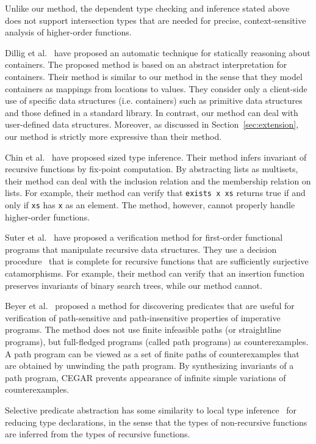 Unlike our method,
the dependent type checking and inference stated
above~\cite{Unno2010,Rondon2008,Kawaguchi2009,Unno2009} does not support
intersection types that are needed for precise, context-sensitive analysis
of higher-order functions.

Dillig et al.~\cite{Dillig2011} have proposed an automatic technique for
statically reasoning about containers.  The proposed method is based on
an abstract interpretation for containers.  Their method is similar to
our method in the sense that they model containers as mappings from
locations to values.  They consider only a client-side use of specific
data structures (i.e. containers) such as primitive data structures and
those defined in a standard library.  In contrast, our method can deal
with user-defined data structures.  Moreover, as discussed in
Section~\ref{sec:extension}, our method is strictly more expressive than
their method.

Chin et al.~\cite{Chin2003} have proposed sized type inference.  Their
method infers invariant of recursive functions by fix-point computation.
By abstracting lists as multisets, their method can deal with the
inclusion relation and the membership relation on lists.  For example, their method
can verify that \texttt{exists x xs} returns true if and only if
\texttt{xs} has \texttt{x} as an element.  The method, however, cannot
properly handle higher-order functions.

Suter et al.~\cite{Suter2011} have proposed a verification method for first-order
functional programs that manipulate recursive data
structures.  They use a decision
procedure~\cite{Suter2010} that is complete for recursive functions that
are sufficiently surjective catamorphisms.  For example, their method
can verify that an insertion function preserves invariants of binary
search trees, while our method cannot.

Beyer et al.~\cite{Beyer2007} proposed a method for discovering
predicates that are useful for verification of path-sensitive and path-insensitive
properties of imperative programs.  The method does not use finite
infeasible paths (or straightline programs), but full-fledged programs
(called path programs) as counterexamples.  A path program can be viewed
as a set of finite paths of counterexamples that are obtained by
unwinding the path program.  By synthesizing invariants of a path
program, CEGAR prevents appearance of infinite simple variations of
counterexamples.

Selective predicate abstraction has some similarity to local type
inference~\cite{Pierce2000} for reducing type declarations, in the sense
that the types of non-recursive functions are inferred from the types of
recursive functions.
